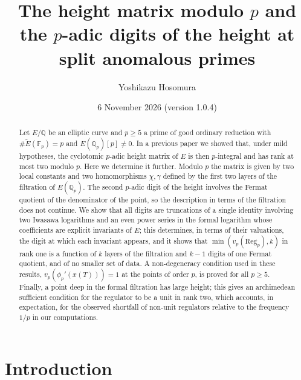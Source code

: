\documentclass[11pt,a4paper]{amsart}
\newcommand{\Q}{\mathbb{Q}}
\newcommand{\Qp}{\mathbb{Q}_p}
\newcommand{\Fp}{\mathbb{F}_p}
\newcommand{\Reg}{\mathrm{Reg}}
\newcommand{\Et}{\widetilde{E}}
\theoremstyle{plain}
\theoremstyle{definition}
\theoremstyle{remark}
\begin{document}
\title[The height matrix modulo $p$ at split anomalous primes]{The height matrix modulo $p$ and the $p$-adic digits of the height at split anomalous primes}
\author{Yoshikazu Hosomura}
\address{Independent researcher, Japan}
\date{6 November 2026 (version 1.0.4)}

\begin{abstract}
Let $E/\Q$ be an elliptic curve and $p\ge5$ a prime of good ordinary reduction with $\#\Et(\Fp)=p$ and $E(\Qp)[p]\ne0$. In a previous paper we showed that, under mild hypotheses, the cyclotomic $p$-adic height matrix of $E$ is then $p$-integral and has rank at most two modulo $p$. Here we determine it further. Modulo $p$ the matrix is given by two local constants and two homomorphisms $\chi,\gamma$ defined by the first two layers of the filtration of $E(\Qp)$. The second $p$-adic digit of the height involves the Fermat quotient of the denominator of the point, so the description in terms of the filtration does not continue. We show that all digits are truncations of a single identity involving two Iwasawa logarithms and an even power series in the formal logarithm whose coefficients are explicit invariants of $E$; this determines, in terms of their valuations, the digit at which each invariant appears, and it shows that $\min(v_p(\Reg_p),k)$ in rank one is a function of $k$ layers of the filtration and $k-1$ digits of one Fermat quotient, and of no smaller set of data. A non-degeneracy condition used in these results, $v_p(\phi_p'(x(T)))=1$ at the points of order $p$, is proved for all $p\ge5$. Finally, a point deep in the formal filtration has large height; this gives an archimedean sufficient condition for the regulator to be a unit in rank two, which accounts, in expectation, for the observed shortfall of non-unit regulators relative to the frequency $1/p$ in our computations.
\end{abstract}

\maketitle

\section{Introduction}\label{sec:intro}
\end{document}
